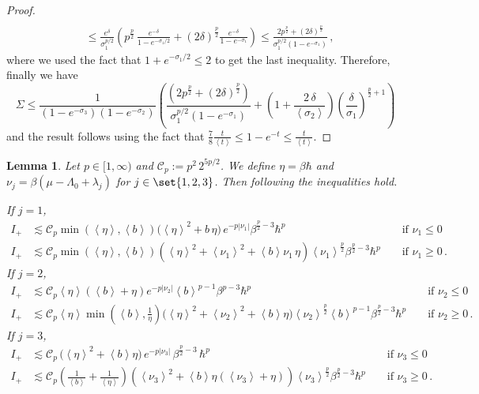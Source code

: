 \documentclass[11pt]{amsart}
\theoremstyle{plain}
\newtheorem{lem}[theorem]{Lemma}
\theoremstyle{definition}
\newcommand		{\lt}			{\left}				%
\newcommand		{\rt}			{\right}			%
\renewcommand	{\(}			{\lt(}
\renewcommand	{\)}			{\rt)}
\newcommand		{\bangle}[1]	{\lt\langle #1\rt\rangle}
\newcommand		{\weight}[1]	{\bangle{#1}}	%
\newcommand		{\n}[1]			{\lt\lvert #1 \rt\rvert}
\newcommand		{\cC}			{\mathcal{C}}
\begin{document}
\begin{proof}
\begin{align*}
			\\
			&\leq \frac{e^\delta}{\sigma_1^{p/2}}\lt( p^\frac{p}{2}\,  \frac{e^{- \delta}}{1- e^{-\sigma_1/2}} + \lt(2\delta\rt)^\frac{p}{2} \frac{e^{- \delta}}{1- e^{-\sigma_1}} \rt) \leq \frac{2 p^\frac{p}{2} + \lt(2\delta\rt)^\frac{p}{2}}{\sigma_1^{p/2}\lt(1- e^{-\sigma_1}\rt)}\,,
		\end{align*}
		where we used the fact that $1 + e^{-\sigma_1/2} \leq 2$ to get the last inequality. Therefore, finally we have
		\begin{equation*}
			\Sigma \leq \frac{1}{\lt(1-e^{-\sigma_3}\rt)\lt(1-e^{-\sigma_2}\rt)}
			\lt(\frac{\lt( 2 p^\frac{p}{2} + \lt(2\delta\rt)^\frac{p}{2} \rt)}{\sigma_1^{p/2}\lt(1- e^{-\sigma_1}\rt)} 
			+  \lt(1+\frac{2\,\delta}{\weight{\sigma_2}}\rt) \lt(\frac{\delta}{\sigma_1}\rt)^{\frac{p}{2}+1} \rt)
		\end{equation*}
		and the result follows using the fact that $\frac{7}{8} \frac{t}{\weight{t}} \leq 1-e^{-t} \leq \frac{t}{\weight{t}}$.
	\end{proof}

    \begin{lem}\label{lem:I_plus}
        Let $p\in[1,\infty)$ and $\cC_p := p^2\, 2^{5p/2}$. We define $\eta=\beta\hbar$ and $\nu_j = \beta\lt(\mu-\Lambda_0+\lambda_j\rt)$ for $j\in\set{1,2,3}$. Then following the inequalities hold.

        \noindent If $j=1$,
        \begin{align*}
            I_+ &\lesssim \cC_p \min(\weight{\eta},\weight{b}) \bigl(\weight{\eta}^2 + b\,\eta\bigr)\,e^{-p\n{\nu_1}} \beta^{\frac{p}{2}-3} \hbar^p && \text{ if } \nu_1 \leq 0
            \\
            I_+ &\lesssim \cC_p \min(\weight{\eta},\weight{b}) \lt(\weight{\eta}^2 + \weight{\nu_1}^2 + \weight{b} \nu_1\,\eta\rt) \weight{\nu_1}^\frac{p}{2} \beta^{\frac{p}{2}-3} \hbar^p && \text{ if } \nu_1 \geq 0 \, .
        \end{align*}
        If $j=2$,
        \begin{align*}
			I_+ &\lesssim \cC_p \weight{\eta} \lt(\weight{b}+\eta\rt)  e^{-p\n{\nu_2}} \weight{b}^{p-1} \beta^{p-3} \hbar^p && \text{ if } \nu_2 \leq 0
            \\
            I_+ &\lesssim \cC_p \weight{\eta} \min(\weight{b},\tfrac{1}{\eta}) \bigl(\weight{\eta}^2 +\weight{\nu_2}^2 + \weight{b}\eta \bigr) \weight{\nu_2}^\frac{p}{2} \weight{b}^{p-1} \beta^{\frac{p}{2}-3} \hbar^p && \text{ if } \nu_2 \geq 0 \, .
		\end{align*}
        If $j=3$,
		\begin{align*}
			I_+ &\lesssim \cC_p \, \bigl(\weight{\eta}^2+\weight{b}\eta\bigr) \, e^{-p\n{\nu_3}} \, \beta^{\frac{p}{2}-3} \, \hbar^p && \text{ if } \nu_3 \leq 0
            \\
            I_+ &\lesssim \cC_p \lt(\tfrac{1}{\weight{b}}+\tfrac{1}{\weight{\eta}}\rt) \lt(\weight{\nu_3}^2 + \weight{b}\eta\lt(\weight{\nu_3}+\eta\rt) \rt) \weight{\nu_3}^\frac{p}{2} \beta^{\frac{p}{2}-3} \hbar^p  && \text{ if } \nu_3 \geq 0 \, .
		\end{align*}
    \end{lem}
\end{document}
